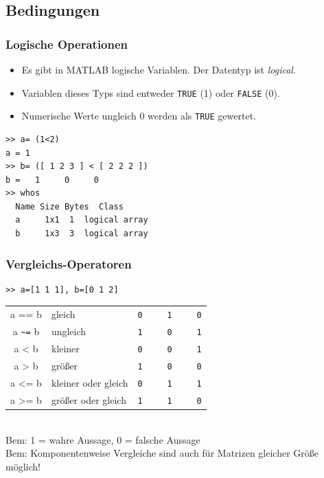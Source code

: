 \subsection{Bedingungen}
%
%
%
\begin{frame}[fragile]\frametitle{Logische Operationen}
\begin{itemize}
\item Es gibt in MATLAB logische Variablen. Der Datentyp ist {\it
  logical}. 
\item Variablen dieses Typs sind entweder \lstinline!TRUE! (1) oder
  \lstinline!FALSE! (0).
\item Numerische Werte ungleich $0$ werden als \lstinline!TRUE! gewertet.
\end{itemize}
\begin{lstlisting}
>> a= (1<2)
a = 1
>> b= ([ 1 2 3 ] < [ 2 2 2 ])
b =   1     0     0
>> whos
  Name Size Bytes  Class
  a     1x1  1  logical array
  b     1x3  3  logical array
\end{lstlisting}
\end{frame}
%
%
%
\begin{frame}[fragile]\frametitle{Vergleichs-Operatoren}
\begin{lstlisting} 
>> a=[1 1 1], b=[0 1 2] 
\end{lstlisting}
\begin{tabular}{cll}
a == b & gleich &   \lstinline!0     1     0!\\
a \lstinline!~=! b & ungleich & \lstinline!1     0     1!\\
a < b & kleiner & \lstinline!0     0     1!\\
a > b & größer & \lstinline!1     0     0!\\
a <= b & kleiner oder gleich & \lstinline!0     1     1!\\
a >= b & größer oder gleich & \lstinline!1     1     0!\\
\end{tabular}
\\
\alert{Bem:} \alert{ 1 = wahre Aussage, 0 = falsche Aussage}\\
\alert{Bem:} Komponentenweise Vergleiche sind auch für Matrizen
gleicher Größe möglich! 
\end{frame}
%
%
%
